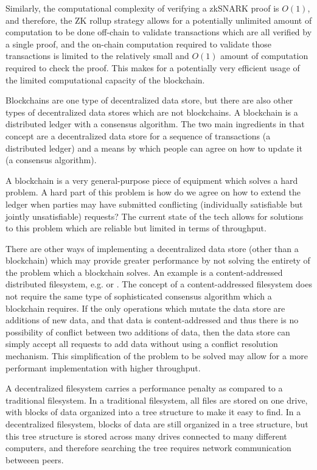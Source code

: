 \documentclass[12pt]{article}
\begin{document}
Similarly, the computational complexity of verifying a zkSNARK proof is $O(1)$, and therefore, the ZK rollup strategy allows for a potentially unlimited amount of computation to be done off-chain to validate transactions which are all verified by a single proof, and the on-chain computation required to validate those transactions is limited to the relatively small and $O(1)$ amount of computation required to check the proof. This makes for a potentially very efficient usage of the limited computational capacity of the blockchain.

Blockchains are one type of decentralized data store, but there are also other types of decentralized data stores which are not blockchains. A blockchain is a distributed ledger with a consensus algorithm. The two main ingredients in that concept are a decentralized data store for a sequence of transactions (a distributed ledger) and a means by which people can agree on how to update it (a consensus algorithm).

A blockchain is a very general-purpose piece of equipment which solves a hard problem. A hard part of this problem is how do we agree on how to extend the ledger when parties may have submitted conflicting (individually satisfiable but jointly unsatisfiable) requests? The current state of the tech allows for solutions to this problem which are reliable but limited in terms of throughput.

There are other ways of implementing a decentralized data store (other than a blockchain) which may provide greater performance by not solving the entirety of the problem which a blockchain solves. An example is a content-addressed distributed filesystem, e.g. \cite{dat} or \cite{ipfs}. The concept of a content-addressed filesystem does not require the same type of sophisticated consensus algorithm which a blockchain requires. If the only operations which mutate the data store are additions of new data, and that data is content-addressed and thus there is no possibility of conflict between two additions of data, then the data store can simply accept all requests to add data without using a conflict resolution mechanism. This simplification of the problem to be solved may allow for a more performant implementation with higher throughput.

A decentralized filesystem carries a performance penalty as compared to a traditional filesystem. In a traditional filesystem, all files are stored on one drive, with blocks of data organized into a tree structure to make it easy to find. In a decentralized filesystem, blocks of data are still organized in a tree structure, but this tree structure is stored across many drives connected to many different computers, and therefore searching the tree requires network communication betweeen peers.
\end{document}
